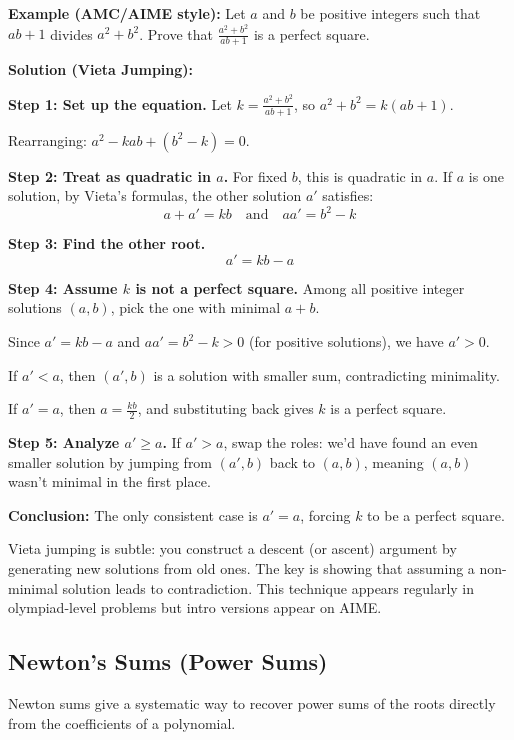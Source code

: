 \documentclass[12pt]{extarticle}
\begin{document}
\begin{examplebox}
\textbf{Example (AMC/AIME style):} Let $a$ and $b$ be positive integers such that $ab+1$ divides $a^2+b^2$. Prove that $\frac{a^2+b^2}{ab+1}$ is a perfect square.

\textbf{Solution (Vieta Jumping):}

\textbf{Step 1: Set up the equation.} Let $k = \frac{a^2+b^2}{ab+1}$, so $a^2+b^2 = k(ab+1)$.

Rearranging: $a^2 - kab + (b^2-k) = 0$.

\textbf{Step 2: Treat as quadratic in $a$.} For fixed $b$, this is quadratic in $a$. If $a$ is one solution, by Vieta's formulas, the other solution $a'$ satisfies:
\[
a + a' = kb \quad \text{and} \quad aa' = b^2-k
\]

\textbf{Step 3: Find the other root.}
\[
a' = kb - a
\]

\textbf{Step 4: Assume $k$ is not a perfect square.} Among all positive integer solutions $(a,b)$, pick the one with minimal $a+b$. 

Since $a' = kb - a$ and $aa' = b^2-k > 0$ (for positive solutions), we have $a' > 0$.

If $a' < a$, then $(a',b)$ is a solution with smaller sum, contradicting minimality.

If $a' = a$, then $a = \frac{kb}{2}$, and substituting back gives $k$ is a perfect square.

\textbf{Step 5: Analyze $a' \ge a$.} If $a' > a$, swap the roles: we'd have found an even smaller solution by jumping from $(a',b)$ back to $(a,b)$, meaning $(a,b)$ wasn't minimal in the first place.

\textbf{Conclusion:} The only consistent case is $a' = a$, forcing $k$ to be a perfect square.
\end{examplebox}

\begin{remarkbox}
Vieta jumping is subtle: you construct a descent (or ascent) argument by generating new solutions from old ones. The key is showing that assuming a non-minimal solution leads to contradiction. This technique appears regularly in olympiad-level problems but intro versions appear on AIME.
\end{remarkbox}

\subsection{Newton's Sums (Power Sums)}

Newton sums give a systematic way to recover power sums of the roots directly from the coefficients of a polynomial.
\end{document}
